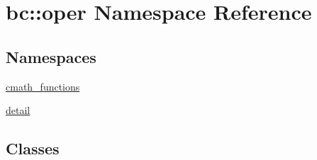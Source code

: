 \hypertarget{namespacebc_1_1oper}{}\section{bc\+:\+:oper Namespace Reference}
\label{namespacebc_1_1oper}
\subsection*{Namespaces}
\begin{DoxyCompactItemize}
\item 
 \hyperlink{namespacebc_1_1oper_1_1cmath__functions}{cmath\+\_\+functions}
\item 
 \hyperlink{namespacebc_1_1oper_1_1detail}{detail}
\end{DoxyCompactItemize}
\subsection*{Classes}
